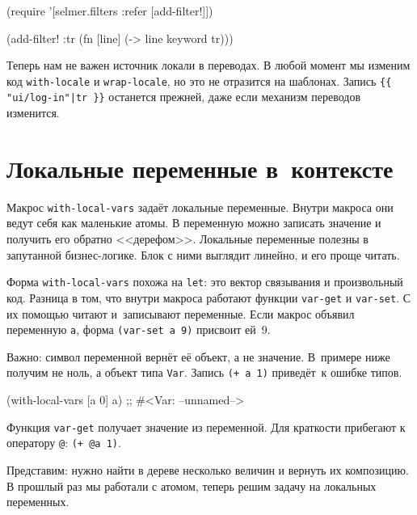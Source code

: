 \else

\begin{english}
  \begin{clojure}
(require '[selmer.filters :refer [add-filter!]])

(add-filter! :tr
 (fn [line]
   (-> line keyword tr)))
  \end{clojure}
\end{english}

\fi

Теперь нам не важен источник локали в переводах. В любой момент мы изменим код
\verb|with-locale| и \verb|wrap-locale|, но это не отразится на
шаблонах. Запись \verb={{ "ui/log-in"|tr }}= останется прежней, даже если
механизм переводов изменится.

\section{Локальные переменные в~контексте}


Макрос \verb|with-local-vars| задаёт локальные переменные. Внутри макроса они
ведут себя как маленькие атомы. В переменную можно записать значение и получить
его обратно <<дерефом>>. Локальные переменные полезны в запутанной
бизнес-логике. Блок с ними выглядит линейно, и его проще читать.

Форма \verb|with-local-vars| похожа на \verb|let|: это вектор связывания и
произвольный код. Разница в том, что внутри макроса работают функции
\verb|var-get| и \verb|var-set|. С их помощью читают и~записывают
переменные. Если макрос объявил переменную \verb|a|, форма \verb|(var-set a 9)|
присвоит ей~9.

Важно: символ переменной вернёт её объект, а не значение. В~примере ниже получим
не ноль, а объект типа \verb|Var|. Запись \verb|(+ a 1)| приведёт~к ошибке
типов.

\begin{english}
  \begin{clojure}
(with-local-vars [a 0] a)
;; #<Var: --unnamed-->
  \end{clojure}
\end{english}

Функция \verb|var-get| получает значение из переменной. Для краткости
прибегают к оператору \verb|@|: \verb|(+ @a 1)|.

Представим: нужно найти в дереве несколько величин и вернуть их композицию. В
прошлый раз мы работали с атомом, теперь решим задачу на локальных переменных.

